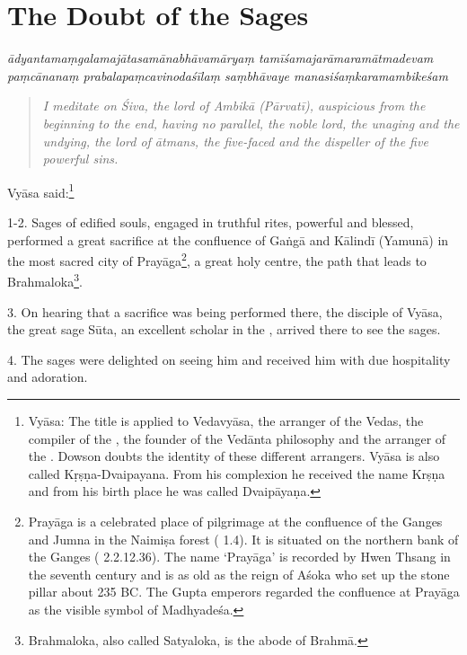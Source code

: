 \chapter{The Doubt of the Sages}

\begin{shloka}\itshape
  ādyantamaṃgalamajātasamānabhāvamāryaṃ tamīśamajarāmaramātmadevam \\
  paṃcānanaṃ prabalapaṃcavinodaśīlaṃ saṃbhāvaye manasiśaṃkaramambikeśam
\end{shloka}

\begin{quote}
  \emph{I meditate on Śiva, the lord of Ambikā (Pārvatī), auspicious from the
        beginning to the end, having no parallel, the noble lord, the unaging
        and the undying, the lord of ātmans, the five-faced and the dispeller
        of the five powerful sins.}
\end{quote}

Vyāsa said:\footnote{Vyāsa: The title is applied to Vedavyāsa, the arranger
of the Vedas, the compiler of the , the founder of the Vedānta
philosophy and the arranger of the . Dowson doubts the identity of
these different arrangers. Vyāsa is also called Kṛṣṇa-Dvaipayana. From his
complexion he received the name Krṣṇa and from his birth place he was called
Dvaipāyaṇa.}

1-2. Sages of edified souls, engaged in truthful rites, powerful and blessed,
performed a great sacrifice at the confluence of Gaṅgā and Kālindī (Yamunā) in
the most sacred city of Prayāga\footnote{Prayāga is a celebrated place of
pilgrimage at the confluence of the Ganges and Jumna in the Naimiṣa forest
( 1.4). It is situated on the northern bank
of the Ganges ( 2.2.12.36). The name ‘Prayāga’ is recorded by
Hwen Thsang in the seventh century and is as old as the reign of Aśoka who set
up the stone pillar about 235 BC. The Gupta emperors regarded the confluence at
Prayāga as the visible symbol of Madhyadeśa.}, a great holy centre, the path
that leads to Brahmaloka\footnote{Brahmaloka, also called Satyaloka, is the
abode of Brahmā.}.

3. On hearing that a sacrifice was being performed there, the disciple of Vyāsa,
the great sage Sūta, an excellent scholar in the , arrived there to
see the sages.

4. The sages were delighted on seeing him and received him with due hospitality
and adoration.

